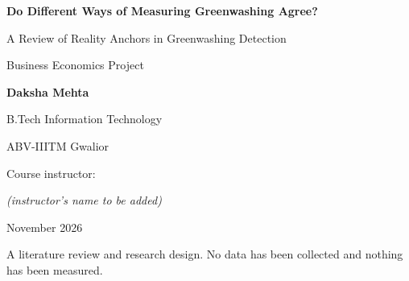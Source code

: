 \documentclass[12pt,a4paper]{article}
\begin{document}
\begin{titlepage}
\centering
\vspace*{2.2cm}
{\LARGE\bfseries Do Different Ways of Measuring Greenwashing Agree?\par}
\vspace{0.4cm}
{\Large A Review of Reality Anchors in Greenwashing Detection\par}
\vspace{2.0cm}
{\large Business Economics Project\par}
\vspace{1.6cm}
{\Large\bfseries Daksha Mehta\par}
\vspace{0.4cm}
{\large B.Tech Information Technology\par}
{\large ABV-IIITM Gwalior\par}
\vspace{1.6cm}
{\large Course instructor: \underline{\hspace{6cm}}\par}
{\small\itshape (instructor's name to be added)\par}
\vspace{1.6cm}
{\large November 2026\par}
\vfill
{\small A literature review and research design. No data has been collected and nothing has been
measured.\par}
\end{titlepage}

\begin{abstract}
\noindent
Greenwashing is the gap between how environmentally responsible a company says it is and how it
actually behaves. Measuring that gap needs an outside reference, which we call a reality anchor:
regulatory violations, measured emissions, a commercial ratings gap, news and controversies, or
nothing beyond the company's own text. This report reviews 24 papers, five in detail and nineteen
more from four publishers, to ask whether measures built on different anchors identify the same
companies. The talk--action gap appears under every anchor that has been tested. Conclusions on
mandatory disclosure, on who talks more and on whether large firms are cleaner depend on the
measure used, and size and visibility appear to shape what gets measured. As far as we found, no
study builds several greenwashing indices on the same firms, each with a different anchor, and
tests whether they rank the same firms as worst. We set out a design for that test, seven
hypotheses and twelve proposed improvements. This is a review and design project: no data has
been collected and nothing has been measured.
\end{abstract}
\end{document}
